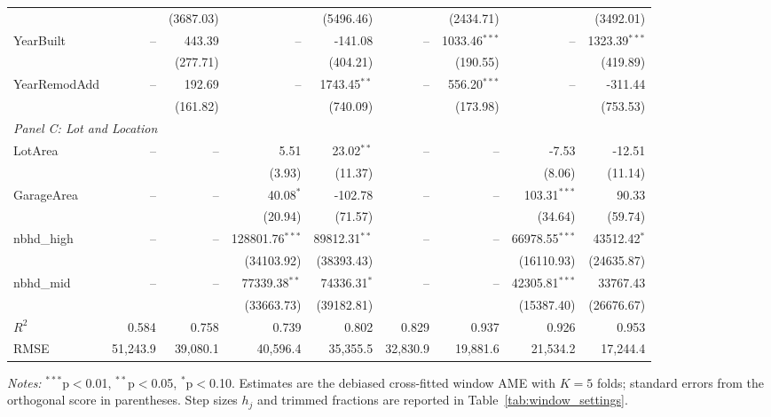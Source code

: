 \documentclass[12pt]{article}
\begin{document}
\begin{table}[htbp]
{\begin{threeparttable}
\begin{tabular}{lrrrrrrrr}
					&  & (3687.03) &  & (5496.46) &  & (2434.71) &  & (3492.01) \\
					\quad YearBuilt & -- & 443.39 & -- & -141.08 & -- & 1033.46$^{***}$ & -- & 1323.39$^{***}$ \\
					&  & (277.71) &  & (404.21) &  & (190.55) &  & (419.89) \\
					\quad YearRemodAdd & -- & 192.69 & -- & 1743.45$^{**}$ & -- & 556.20$^{***}$ & -- & -311.44 \\
					&  & (161.82) &  & (740.09) &  & (173.98) &  & (753.53) \\
					\midrule
					\multicolumn{9}{l}{\textit{Panel C: Lot and Location}} \\
					\quad LotArea & -- & -- & 5.51 & 23.02$^{**}$ & -- & -- & -7.53 & -12.51 \\
					&  &  & (3.93) & (11.37) &  &  & (8.06) & (11.14) \\
					\quad GarageArea & -- & -- & 40.08$^{*}$ & -102.78 & -- & -- & 103.31$^{***}$ & 90.33 \\
					&  &  & (20.94) & (71.57) &  &  & (34.64) & (59.74) \\
					\quad nbhd\_high & -- & -- & 128801.76$^{***}$ & 89812.31$^{**}$ & -- & -- & 66978.55$^{***}$ & 43512.42$^{*}$ \\
					&  &  & (34103.92) & (38393.43) &  &  & (16110.93) & (24635.87) \\
					\quad nbhd\_mid & -- & -- & 77339.38$^{**}$ & 74336.31$^{*}$ & -- & -- & 42305.81$^{***}$ & 33767.43 \\
					&  &  & (33663.73) & (39182.81) &  &  & (15387.40) & (26676.67) \\
					\midrule
					$R^2$ & 0.584 & 0.758 & 0.739 & 0.802 & 0.829 & 0.937 & 0.926 & 0.953 \\
					RMSE & 51,243.9 & 39,080.1 & 40,596.4 & 35,355.5 & 32,830.9 & 19,881.6 & 21,534.2 & 17,244.4 \\
					\bottomrule
					\end{tabular}
					\begin{tablenotes}
					\footnotesize
					\item \textit{Notes:} $^{***}$p$<$0.01, $^{**}$p$<$0.05, $^{*}$p$<$0.10. Estimates are the debiased cross-fitted window AME with $K=5$ folds; standard errors from the orthogonal score in parentheses. Step sizes $h_j$ and trimmed fractions are reported in Table~\ref{tab:window_settings}.
					\end{tablenotes}
			\end{threeparttable}
		}%
	\end{table}
	
\end{document}
